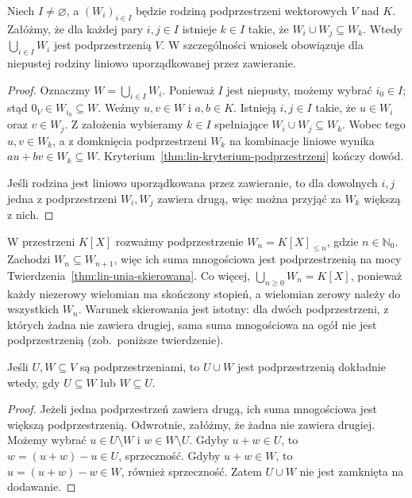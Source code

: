 \begin{twierdzenie}
\label{thm:lin-unia-skierowana}
Niech \(I\neq\varnothing\), a
\((W_i)_{i\in I}\) będzie rodziną podprzestrzeni
wektorowych \(V\) nad \(K\).
Załóżmy, że dla każdej pary \(i,j\in I\)
istnieje \(k\in I\) takie, że
\(W_i\cup W_j\subseteq W_k\).
Wtedy \(\bigcup_{i\in I}W_i\) jest podprzestrzenią \(V\).
W szczególności wniosek obowiązuje dla niepustej
rodziny liniowo uporządkowanej przez zawieranie.
\end{twierdzenie}
\begin{proof}
Oznaczmy \(W=\bigcup_{i\in I}W_i\).
Ponieważ \(I\) jest niepusty, możemy wybrać
\(i_0\in I\); stąd \(0_V\in W_{i_0}\subseteq W\).
Weźmy \(u,v\in W\) i \(a,b\in K\).
Istnieją \(i,j\in I\) takie, że
\(u\in W_i\) oraz \(v\in W_j\).
Z założenia wybieramy \(k\in I\)
spełniające \(W_i\cup W_j\subseteq W_k\).
Wobec tego \(u,v\in W_k\), a z domknięcia
podprzestrzeni \(W_k\) na kombinacje liniowe
wynika \(au+bv\in W_k\subseteq W\).
Kryterium~\ref{thm:lin-kryterium-podprzestrzeni}
kończy dowód.

Jeśli rodzina jest liniowo uporządkowana przez
zawieranie, to dla dowolnych \(i,j\) jedna
z podprzestrzeni \(W_i,W_j\) zawiera drugą,
więc można przyjąć za \(W_k\) większą z nich.
\end{proof}

\begin{przyklad}
\label{prz:lin-unia-wielomiany}
W przestrzeni \(K[X]\) rozważmy podprzestrzenie
\(W_n=K[X]_{\leq n}\), gdzie \(n\in\mathbb N_0\).
Zachodzi \(W_n\subseteq W_{n+1}\), więc
ich suma mnogościowa jest podprzestrzenią na mocy
Twierdzenia~\ref{thm:lin-unia-skierowana}.
Co więcej, \(\bigcup_{n\geq0}W_n=K[X]\),
ponieważ każdy niezerowy wielomian ma
skończony stopień, a wielomian zerowy
należy do wszystkich \(W_n\).
Warunek skierowania jest istotny: dla dwóch
podprzestrzeni, z których żadna nie zawiera
drugiej, sama suma mnogościowa na ogół nie jest
podprzestrzenią (zob.\ poniższe twierdzenie).
\end{przyklad}

\begin{twierdzenie}
\label{thm:lin-unia}
Jeśli \(U,W\subseteq V\) są podprzestrzeniami,
to \(U\cup W\) jest podprzestrzenią dokładnie wtedy,
gdy \(U\subseteq W\) lub \(W\subseteq U\).
\end{twierdzenie}
\begin{proof}
Jeżeli jedna podprzestrzeń zawiera drugą, ich suma mnogościowa
jest większą podprzestrzenią.
Odwrotnie, załóżmy, że żadna nie zawiera drugiej.
Możemy wybrać \(u\in U\setminus W\) i \(w\in W\setminus U\).
Gdyby \(u+w\in U\), to \(w=(u+w)-u\in U\), sprzeczność.
Gdyby \(u+w\in W\), to \(u=(u+w)-w\in W\), również sprzeczność.
Zatem \(U\cup W\) nie jest zamknięta na dodawanie.
\end{proof}

